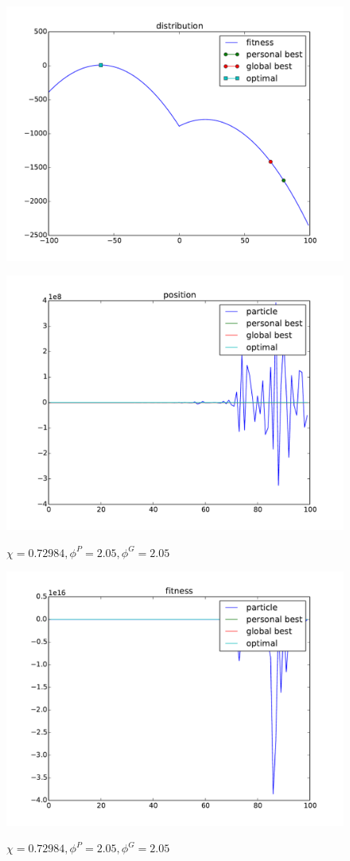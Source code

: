 \begin{figure}[ht]
\centering
\includegraphics[width=.7\linewidth]{./simfig/case2/distribution2}
\label{fig:case2-1:distribution} 
\end{figure}

\begin{figure}[ht]
\centering
\includegraphics[width=.7\linewidth]{./simfig/case2/position2-1} 
\label{fig:case2-1:position}
\caption{$ \chi = 0.72984 , \phi^{P} = 2.05 , \phi^{G} = 2.05 $ }
\end{figure}

\begin{figure}[ht]
\centering
\includegraphics[width=.7\linewidth]{./simfig/case2/fitness2-1} 
\label{fig:case2-1:fitness}
\caption{$ \chi = 0.72984 , \phi^{P} = 2.05 , \phi^{G} = 2.05 $ }
\end{figure}

